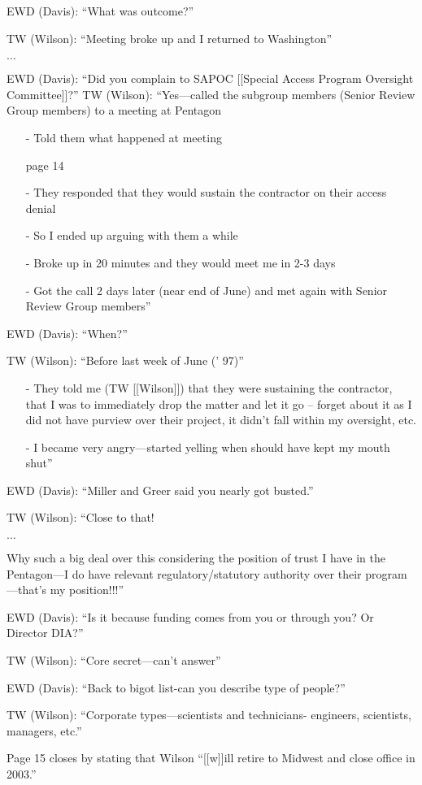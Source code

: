 \begin{svgraybox}
\noindent EWD (Davis): ``What was outcome?''

\noindent TW (Wilson): ``Meeting broke up and I returned to Washington''

$\ldots$

\noindent EWD (Davis): ``Did you complain to SAPOC [[Special Access Program Oversight Committee]]?''
\noindent TW (Wilson): ``Yes---called the subgroup members (Senior Review Group members) to a meeting at Pentagon
\begin{enumerate}
\item[-]
Told them what happened at meeting
\item[]page 14
\item[-]
They responded that they would sustain the contractor on their access denial
\item[-]
So I ended up arguing with them a while
\item[-]
Broke up in 20 minutes and they would meet me in 2-3 days
\item[-]
Got the call 2 days later (near end of June) and met again with Senior Review Group members''
\end{enumerate}

\noindent EWD (Davis): ``When?''

\noindent TW (Wilson): ``Before last week of June (' 97)''
\begin{enumerate}
\item[-]  They told me (TW [[Wilson]]) that they were sustaining the contractor, that I was to
immediately drop the matter and let it go -- forget about it as I did not have
purview over their project, it didn't fall within my oversight, etc.
\item[-]  I became very angry---started yelling when should have kept my mouth shut''
\end{enumerate}

\noindent EWD (Davis): ``Miller and Greer said you nearly got busted.''

\noindent TW (Wilson): ``Close to that!

$\ldots$

Why such a big deal over this considering the position of trust I have in the
Pentagon---I do have relevant regulatory/statutory authority over their program---that's my position!!!''

\noindent EWD (Davis): ``Is it because funding comes from you or through you? Or Director DIA?''

\noindent TW (Wilson): ``Core secret---can't answer''

\noindent EWD (Davis): ``Back to bigot list-can you describe type of people?''

\noindent TW (Wilson): ``Corporate types---scientists and technicians- engineers, scientists, managers, etc.''

Page 15 closes by stating that Wilson ``[[w]]ill retire to Midwest and close office in 2003.''
\end{svgraybox}

